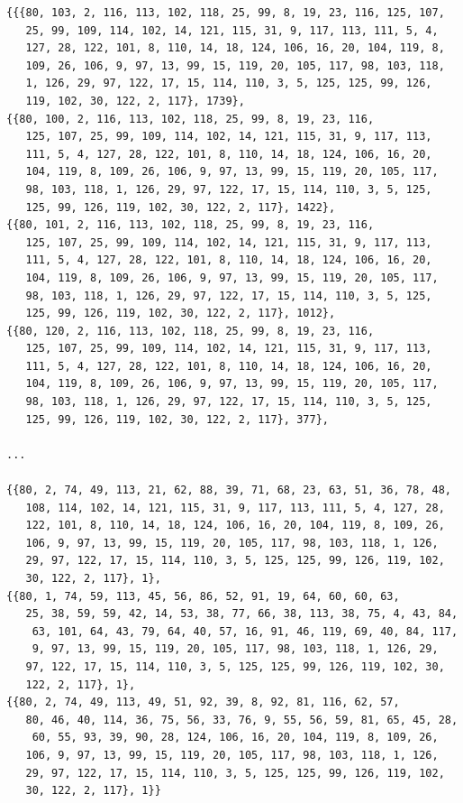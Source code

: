 \begin{lstlisting}[style=custommath]
{{{80, 103, 2, 116, 113, 102, 118, 25, 99, 8, 19, 23, 116, 125, 107, 
   25, 99, 109, 114, 102, 14, 121, 115, 31, 9, 117, 113, 111, 5, 4, 
   127, 28, 122, 101, 8, 110, 14, 18, 124, 106, 16, 20, 104, 119, 8, 
   109, 26, 106, 9, 97, 13, 99, 15, 119, 20, 105, 117, 98, 103, 118, 
   1, 126, 29, 97, 122, 17, 15, 114, 110, 3, 5, 125, 125, 99, 126, 
   119, 102, 30, 122, 2, 117}, 1739}, 
{{80, 100, 2, 116, 113, 102, 118, 25, 99, 8, 19, 23, 116, 
   125, 107, 25, 99, 109, 114, 102, 14, 121, 115, 31, 9, 117, 113, 
   111, 5, 4, 127, 28, 122, 101, 8, 110, 14, 18, 124, 106, 16, 20, 
   104, 119, 8, 109, 26, 106, 9, 97, 13, 99, 15, 119, 20, 105, 117, 
   98, 103, 118, 1, 126, 29, 97, 122, 17, 15, 114, 110, 3, 5, 125, 
   125, 99, 126, 119, 102, 30, 122, 2, 117}, 1422}, 
{{80, 101, 2, 116, 113, 102, 118, 25, 99, 8, 19, 23, 116, 
   125, 107, 25, 99, 109, 114, 102, 14, 121, 115, 31, 9, 117, 113, 
   111, 5, 4, 127, 28, 122, 101, 8, 110, 14, 18, 124, 106, 16, 20, 
   104, 119, 8, 109, 26, 106, 9, 97, 13, 99, 15, 119, 20, 105, 117, 
   98, 103, 118, 1, 126, 29, 97, 122, 17, 15, 114, 110, 3, 5, 125, 
   125, 99, 126, 119, 102, 30, 122, 2, 117}, 1012},
{{80, 120, 2, 116, 113, 102, 118, 25, 99, 8, 19, 23, 116, 
   125, 107, 25, 99, 109, 114, 102, 14, 121, 115, 31, 9, 117, 113, 
   111, 5, 4, 127, 28, 122, 101, 8, 110, 14, 18, 124, 106, 16, 20, 
   104, 119, 8, 109, 26, 106, 9, 97, 13, 99, 15, 119, 20, 105, 117, 
   98, 103, 118, 1, 126, 29, 97, 122, 17, 15, 114, 110, 3, 5, 125, 
   125, 99, 126, 119, 102, 30, 122, 2, 117}, 377},

...

{{80, 2, 74, 49, 113, 21, 62, 88, 39, 71, 68, 23, 63, 51, 36, 78, 48, 
   108, 114, 102, 14, 121, 115, 31, 9, 117, 113, 111, 5, 4, 127, 28, 
   122, 101, 8, 110, 14, 18, 124, 106, 16, 20, 104, 119, 8, 109, 26, 
   106, 9, 97, 13, 99, 15, 119, 20, 105, 117, 98, 103, 118, 1, 126, 
   29, 97, 122, 17, 15, 114, 110, 3, 5, 125, 125, 99, 126, 119, 102, 
   30, 122, 2, 117}, 1},
{{80, 1, 74, 59, 113, 45, 56, 86, 52, 91, 19, 64, 60, 60, 63, 
   25, 38, 59, 59, 42, 14, 53, 38, 77, 66, 38, 113, 38, 75, 4, 43, 84,
    63, 101, 64, 43, 79, 64, 40, 57, 16, 91, 46, 119, 69, 40, 84, 117,
    9, 97, 13, 99, 15, 119, 20, 105, 117, 98, 103, 118, 1, 126, 29, 
   97, 122, 17, 15, 114, 110, 3, 5, 125, 125, 99, 126, 119, 102, 30, 
   122, 2, 117}, 1},
{{80, 2, 74, 49, 113, 49, 51, 92, 39, 8, 92, 81, 116, 62, 57, 
   80, 46, 40, 114, 36, 75, 56, 33, 76, 9, 55, 56, 59, 81, 65, 45, 28,
    60, 55, 93, 39, 90, 28, 124, 106, 16, 20, 104, 119, 8, 109, 26, 
   106, 9, 97, 13, 99, 15, 119, 20, 105, 117, 98, 103, 118, 1, 126, 
   29, 97, 122, 17, 15, 114, 110, 3, 5, 125, 125, 99, 126, 119, 102, 
   30, 122, 2, 117}, 1}}
\end{lstlisting}

